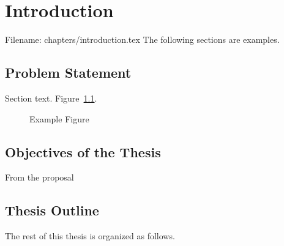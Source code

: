 \chapter{Introduction}\label{intro}

Filename: chapters/introduction.tex
The following sections are examples.
\section{Problem Statement}
Section text. Figure~\ref{fig:example}.
\begin{figure}
	\caption
	{Example Figure \label{fig:example}}
\end{figure}


\section{Objectives of the Thesis}
From the proposal

\section{Thesis Outline} 
The rest of this thesis is organized as follows.